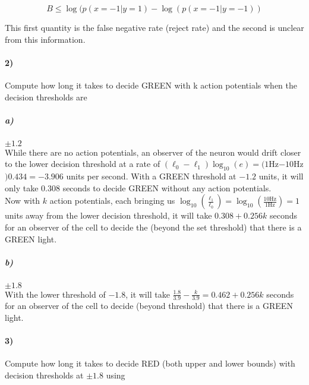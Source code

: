 \documentclass[10pt,letter]{article}
\begin{document}
\[ B \leq \log(p(x=-1 | y=1) - \log(p(x=-1 | y = -1)) \]

This first quantity is the false negative rate (reject rate) and the second is unclear from this information.

\paragraph{2)} Compute how long it takes to decide GREEN with k action potentials when the decision
thresholds are

\subparagraph{a)} $\pm 1.2$\\

While there are no action potentials, an observer of the neuron would drift closer to the lower 
decision threshold at a rate of $(\ell_0 - \ell_1)\log_{10}(e) = (1 $Hz$ - 10 $Hz$)  0.434 = -3.906$
units per second. With a GREEN threshold at $-1.2$ units, it will only take $0.308$ seconds to 
decide GREEN without any action potentials.\\

Now with $k$ action potentials, each bringing us $\log_{10}(\frac{\ell_1}{\ell_0}) = \log_{10}(
\frac{10 \text{Hz}}{1 \text{Hz}}) = 1 $ units away from the lower decision threshold, 
it will take $0.308 + 0.256 k$ seconds 
for an observer of the cell to decide the (beyond the set threshold) that there is a GREEN light.\\

\subparagraph{b)} $\pm 1.8$\\

With the lower threshold of $-1.8$, it will take $\frac{1.8}{3.9} - \frac{k}{3.9} = 
0.462 + 0.256 k$ seconds 
for an observer of the cell to decide (beyond threshold) that there is a GREEN light.\\

\paragraph{3)} Compute how long it takes to decide RED (both upper and lower bounds) with decision
thresholds at $\pm 1.8$ using

%

\end{document}
